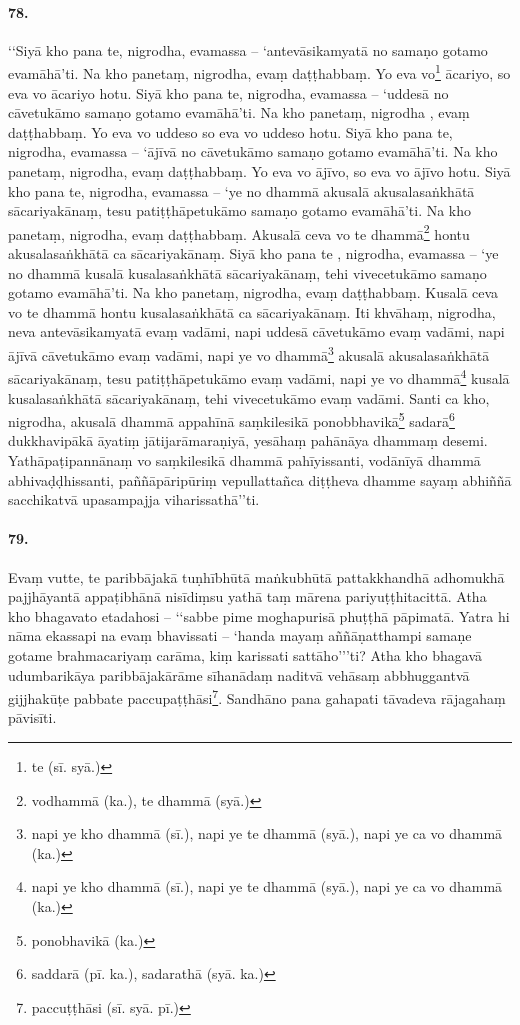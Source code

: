 \paragraph{78.} ‘‘Siyā kho pana te, nigrodha, evamassa – ‘antevāsikamyatā no samaṇo gotamo evamāhā’ti. Na kho panetaṃ, nigrodha, evaṃ daṭṭhabbaṃ. Yo eva vo\footnote{te (sī. syā.)} ācariyo, so eva vo ācariyo hotu. Siyā kho pana te, nigrodha, evamassa – ‘uddesā no cāvetukāmo samaṇo gotamo evamāhā’ti. Na kho panetaṃ, nigrodha , evaṃ daṭṭhabbaṃ. Yo eva vo uddeso so eva vo uddeso hotu. Siyā kho pana te, nigrodha, evamassa – ‘ājīvā no cāvetukāmo samaṇo gotamo evamāhā’ti. Na kho panetaṃ, nigrodha, evaṃ daṭṭhabbaṃ. Yo eva vo ājīvo, so eva vo ājīvo hotu. Siyā kho pana te, nigrodha, evamassa – ‘ye no dhammā akusalā akusalasaṅkhātā sācariyakānaṃ, tesu patiṭṭhāpetukāmo samaṇo gotamo evamāhā’ti. Na kho panetaṃ, nigrodha, evaṃ daṭṭhabbaṃ. Akusalā ceva vo te dhammā\footnote{vodhammā (ka.), te dhammā (syā.)} hontu akusalasaṅkhātā ca sācariyakānaṃ. Siyā kho pana te , nigrodha, evamassa – ‘ye no dhammā kusalā kusalasaṅkhātā sācariyakānaṃ, tehi vivecetukāmo samaṇo gotamo evamāhā’ti. Na kho panetaṃ, nigrodha, evaṃ daṭṭhabbaṃ. Kusalā ceva vo te dhammā hontu kusalasaṅkhātā ca sācariyakānaṃ. Iti khvāhaṃ, nigrodha, neva antevāsikamyatā evaṃ vadāmi, napi uddesā cāvetukāmo evaṃ vadāmi, napi ājīvā cāvetukāmo evaṃ vadāmi, napi ye vo dhammā\footnote{napi ye kho dhammā (sī.), napi ye te dhammā (syā.), napi ye ca vo dhammā (ka.)} akusalā akusalasaṅkhātā sācariyakānaṃ, tesu patiṭṭhāpetukāmo evaṃ vadāmi, napi ye vo dhammā\footnote{napi ye kho dhammā (sī.), napi ye te dhammā (syā.), napi ye ca vo dhammā (ka.)} kusalā kusalasaṅkhātā sācariyakānaṃ, tehi vivecetukāmo evaṃ vadāmi. Santi ca kho, nigrodha, akusalā dhammā appahīnā saṃkilesikā ponobbhavikā\footnote{ponobhavikā (ka.)} sadarā\footnote{saddarā (pī. ka.), sadarathā (syā. ka.)} dukkhavipākā āyatiṃ jātijarāmaraṇiyā, yesāhaṃ pahānāya dhammaṃ desemi. Yathāpaṭipannānaṃ vo saṃkilesikā dhammā pahīyissanti, vodānīyā dhammā abhivaḍḍhissanti, paññāpāripūriṃ vepullattañca diṭṭheva dhamme sayaṃ abhiññā sacchikatvā upasampajja viharissathā’’ti.

\paragraph{79.} Evaṃ vutte, te paribbājakā tuṇhībhūtā maṅkubhūtā pattakkhandhā adhomukhā pajjhāyantā appaṭibhānā nisīdiṃsu yathā taṃ mārena pariyuṭṭhitacittā. Atha kho bhagavato etadahosi – ‘‘sabbe pime moghapurisā phuṭṭhā pāpimatā. Yatra hi nāma ekassapi na evaṃ bhavissati – ‘handa mayaṃ aññāṇatthampi samaṇe gotame brahmacariyaṃ carāma, kiṃ karissati sattāho’’’ti? Atha kho bhagavā udumbarikāya paribbājakārāme sīhanādaṃ naditvā vehāsaṃ abbhuggantvā gijjhakūṭe pabbate paccupaṭṭhāsi\footnote{paccuṭṭhāsi (sī. syā. pī.)}. Sandhāno pana gahapati tāvadeva rājagahaṃ pāvisīti.

